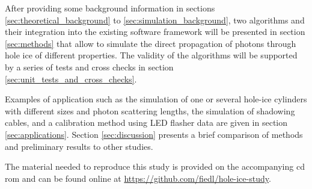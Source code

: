After providing some background information in sections \ref{sec:theoretical_background} to \ref{sec:simulation_background}, two algorithms and their integration into the existing \icecube software framework will be presented in section \ref{sec:methods} that allow to simulate the direct propagation of photons through hole ice of different properties. The validity of the algorithms will be supported by a series of tests and cross checks in section \ref{sec:unit_tests_and_cross_checks}.

Examples of application such as the simulation of one or several hole-ice cylinders with different sizes and photon scattering lengths, the simulation of shadowing cables, and a calibration method using LED flasher data are given in section \ref{sec:applications}. Section \ref{sec:discussion} presents a brief comparison of methods and preliminary results to other studies.

The material needed to reproduce this study is provided on the accompanying cd rom and can be found online at \url{https://github.com/fiedl/hole-ice-study}.

